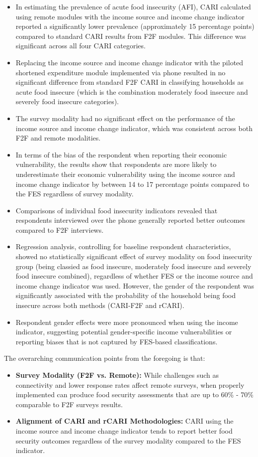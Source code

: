 \documentclass[11pt,harvard]{article}
\begin{document}
	\begin{itemize}
		\item In estimating the prevalence of acute food insecurity (AFI), CARI calculated using remote modules with the income source and income change indicator reported a significantly lower prevalence (approximately 15 percentage points) compared to standard CARI results from F2F modules. This difference was significant across all four CARI categories.
		\item Replacing the income source and income change indicator with the piloted shortened expenditure module implemented via phone resulted in no significant difference from standard F2F CARI in classifying households as acute food insecure (which is the combination moderately food insecure and severely food insecure categories).
		\item The survey modality had no significant effect on the performance of the income source and income change indicator, which was consistent across both F2F and remote modalities.
		\item In terms of the bias of the respondent when reporting their economic vulnerability, the results show that respondents are more likely to underestimate their economic vulnerability using the income source and income change indicator by between 14 to 17 percentage points compared to the FES regardless of survey modality.
		\item Comparisons of individual food insecurity indicators revealed that respondents interviewed over the phone generally reported better outcomes compared to F2F interviews.
		\item Regression analysis, controlling for baseline respondent characteristics, showed no statistically significant effect of survey modality on food insecurity group (being classied as food insecure, moderately food insecure and severely food insecure combined), regardless of whether FES or the income source and income change indicator was used. However, the gender of the respondent was significantly associated with the probability of the household being food insecure across both methods (CARI-F2F and rCARI).
		\item Respondent gender effects were more pronounced when using the income indicator, suggesting potential gender-specific income vulnerabilities or reporting biases that is not captured by FES-based classifications.
	\end{itemize}
	
		The overarching communication points from the foregoing is that:
	\begin{itemize}[left=2.5em]
		\item \textbf{Survey Modality (F2F vs. Remote):} While challenges such as connectivity and lower response rates affect remote surveys, when properly implemented can produce food security assessments that are up to 60\% - 70\% comparable to F2F surveys results.
		\item \textbf{Alignment of CARI and rCARI Methodologies:} CARI using the income source and income change indicator tends to report better food security outcomes regardless of the survey modality compared to the FES indicator.
	\end{itemize}
	
\end{document}
